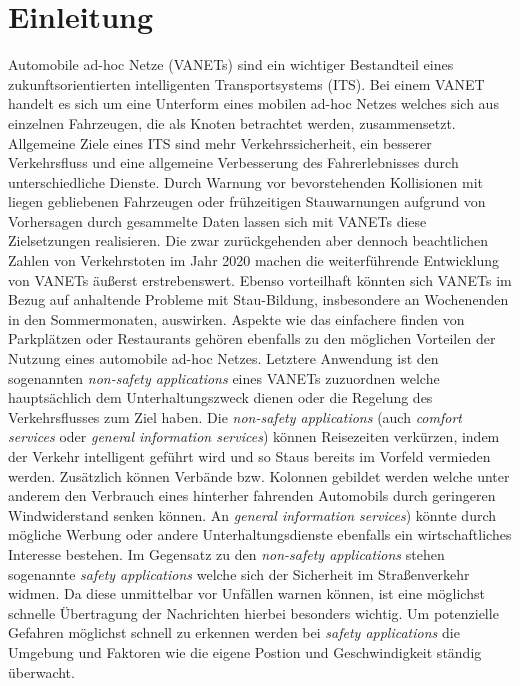 \documentclass[english,runningheads,a4paper]{llncs}[2018/03/10]
\begin{document}
\section{Einleitung}\label{sec:intro}
Automobile ad-hoc Netze (VANETs) sind ein wichtiger Bestandteil eines zukunftsorientierten intelligenten Transportsystems (ITS). %
Bei einem VANET handelt es sich um eine Unterform eines mobilen ad-hoc Netzes welches sich aus einzelnen Fahrzeugen, die als Knoten betrachtet werden, zusammensetzt.
Allgemeine Ziele eines ITS sind mehr Verkehrssicherheit, ein besserer Verkehrsfluss und eine allgemeine Verbesserung des Fahrerlebnisses durch unterschiedliche Dienste.
Durch Warnung vor bevorstehenden Kollisionen mit liegen gebliebenen Fahrzeugen oder frühzeitigen Stauwarnungen aufgrund von Vorhersagen durch gesammelte Daten lassen sich mit VANETs diese Zielsetzungen realisieren.
Die zwar zurückgehenden aber dennoch beachtlichen Zahlen von Verkehrstoten im Jahr 2020\cite{adacVerkehrstote} machen die weiterführende Entwicklung von VANETs äußerst erstrebenswert.
Ebenso vorteilhaft könnten sich VANETs im Bezug auf anhaltende Probleme mit Stau-Bildung, insbesondere an Wochenenden in den Sommermonaten\cite{adacStaus}, auswirken.
Aspekte wie das einfachere finden von Parkplätzen oder Restaurants gehören ebenfalls zu den möglichen Vorteilen der Nutzung eines automobile ad-hoc Netzes.
Letztere Anwendung ist den sogenannten \textit{non-safety applications} eines VANETs zuzuordnen welche hauptsächlich dem Unterhaltungszweck dienen oder die Regelung des Verkehrsflusses zum Ziel haben.
Die \textit{non-safety applications} (auch \textit{comfort services} oder \textit{general information services}) können Reisezeiten verkürzen, indem der Verkehr intelligent geführt wird und so Staus bereits im Vorfeld vermieden werden.
Zusätzlich können Verbände bzw. Kolonnen gebildet werden welche unter anderem den Verbrauch eines hinterher fahrenden Automobils durch geringeren Windwiderstand senken können.
An \textit{general information services}) könnte durch mögliche Werbung oder andere Unterhaltungsdienste ebenfalls ein wirtschaftliches Interesse bestehen.
Im Gegensatz zu den \textit{non-safety applications} stehen sogenannte \textit{safety applications} welche sich der Sicherheit im Straßenverkehr widmen.
Da diese unmittelbar vor Unfällen warnen können, ist eine möglichst schnelle Übertragung der Nachrichten hierbei besonders wichtig.
Um potenzielle Gefahren möglichst schnell zu erkennen werden bei \textit{safety applications} die Umgebung und Faktoren wie die eigene Postion und Geschwindigkeit ständig überwacht.
\end{document}
